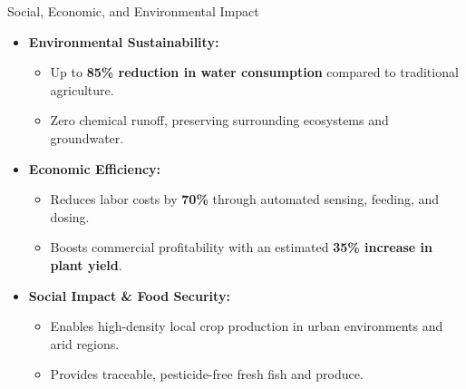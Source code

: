 \documentclass[aspectratio=169, 10pt]{beamer}
\begin{document}
\begin{frame}{Social, Economic, and Environmental Impact}
  \begin{itemize}
    \item \textbf{Environmental Sustainability:}
    \begin{itemize}
      \item Up to \textbf{85\% reduction in water consumption} compared to traditional agriculture.
      \item Zero chemical runoff, preserving surrounding ecosystems and groundwater.
    \end{itemize}
    
    \vspace{0.2cm}
    \item \textbf{Economic Efficiency:}
    \begin{itemize}
      \item Reduces labor costs by \textbf{70\%} through automated sensing, feeding, and dosing.
      \item Boosts commercial profitability with an estimated \textbf{35\% increase in plant yield}.
    \end{itemize}
    
    \vspace{0.2cm}
    \item \textbf{Social Impact \& Food Security:}
    \begin{itemize}
      \item Enables high-density local crop production in urban environments and arid regions.
      \item Provides traceable, pesticide-free fresh fish and produce.
    \end{itemize}
  \end{itemize}
\end{frame}
\end{document}
